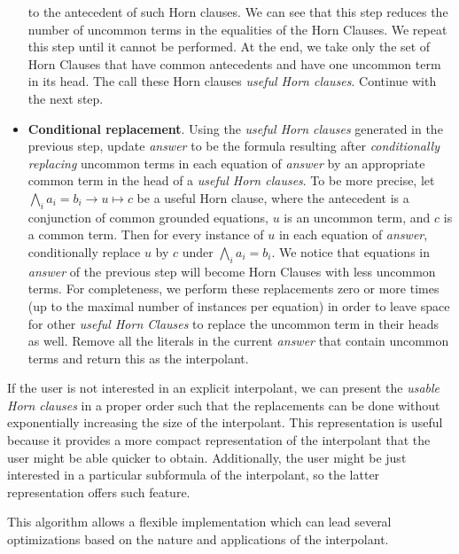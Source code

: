 \begin{itemize}
  to the antecedent of such Horn clauses.
  We can see that this step reduces the number of uncommon 
  terms in the equalities of
  the Horn Clauses. We repeat this step until it cannot 
  be performed. At the end, we take only the
  set of Horn Clauses that have common antecedents 
  and have one uncommon term in its head. The call these
  Horn clauses \emph{useful Horn clauses}. Continue with the next step.
\item \textbf{Conditional replacement}. Using the \emph{useful Horn clauses} 
  generated in the previous
  step, update \emph{answer} to be the formula resulting 
  after \emph{conditionally replacing}
  uncommon terms in each equation of \emph{answer} by an 
  appropriate common term in the head of
  a \emph{useful Horn clauses}.
  To be more precise, let $\bigwedge_i a_i = b_i \rightarrow u \mapsto c$ 
  be a useful Horn clause,
  where the antecedent is a conjunction of common grounded equations, 
  $u$ is an uncommon term,
  and $c$ is a common term.
  Then for every instance of $u$ in each equation of \emph{answer}, conditionally replace $u$
  by $c$ under $\bigwedge_i a_i = b_i$.
  We notice that equations in \emph{answer}  of the previous step will become Horn Clauses with
  less uncommon terms. For completeness, we perform these replacements zero or more times
  (up to the maximal number of instances per equation) in order to leave space for other
  \emph{useful Horn Clauses} to replace the uncommon term in their heads as well.
  Remove all the literals in the current \emph{answer} that contain 
  uncommon terms and return this as the interpolant.
\end{itemize}

If the user is not interested in an explicit interpolant, 
we can present the \emph{usable Horn
  clauses} in a proper order such that the replacements 
  can be done without exponentially increasing
the size of the interpolant. This representation 
is useful because it provides a more compact
representation of the interpolant that the user 
might be able quicker to obtain.
Additionally, the user might be just 
interested in a particular subformula of 
the interpolant, so the
latter representation offers such feature.

This algorithm allows a flexible implementation 
which can lead several optimizations
based on the nature and applications of the 
interpolant.

